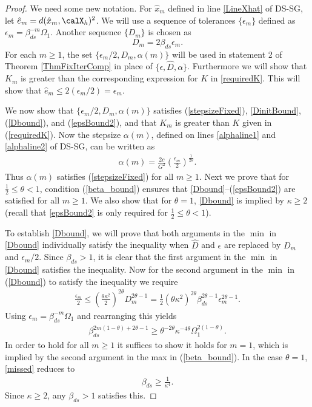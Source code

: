  \begin{proof}
 We need some new notation. For $\hat{x}_m$ defined in line \ref{LineXhat} of DS-SG, let $\hat{e}_m=d(\hat{x}_m,\calX_h)^2$. We will use a sequence of tolerances $\{\epsilon_m\}$ defined as $\epsilon_m=\beta_{ds}^{-m}\Omega_1$. Another sequence $\{D_m\}$ is chosen as 
 $$D_m = 2\beta_{ds}\epsilon_m.$$ 
   For each $m\geq 1$, the set $\{\epsilon_m/2,D_m,\alpha(m)\}$ will be used in statement 2 of Theorem \ref{ThmFixIterComp} in place of $\{\epsilon,\hat{D},\alpha\}$. Furthermore we will show that $K_m$ is greater than the corresponding expression for $K$ in \eqref{requiredK}. This will show that $\hat{e}_m\leq 2(\epsilon_m/2)=\epsilon_m$.
   


   We now show that $\{\epsilon_m/2,D_m,\alpha(m)\}$ satisfies (\ref{stepsizeFixed}), \eqref{DinitBound}, (\ref{Dbound}),  and (\ref{epsBound2}), and that $K_m$ is greater than $K$ given in (\ref{requiredK}). Now
the stepsize $\alpha(m)$, defined on lines \ref{alphaline1} and \ref{alphaline2} of DS-SG, can be written as
   \begin{eqnarray*}
   \alpha(m) = \frac{2 c}{ G^2}\left(\frac{\epsilon_m}{2}\right)^{\frac{1}{2\theta}}.
   \end{eqnarray*}
       Thus $\alpha(m)$ satisfies (\ref{stepsizeFixed}) for all $m\geq 1$. %
          Next we prove that for $\frac{1}{2}\leq \theta<1$, condition (\ref{beta_bound}) ensures that \eqref{Dbound}--(\ref{epsBound2}) are satisfied for all $m\geq 1$. We also show that for $\theta=1$, \eqref{Dbound} is implied by $\kappa\geq 2$ (recall that \eqref{epsBound2} is only required for $\frac{1}{2}\leq\theta<1$). 
          
             To establish \eqref{Dbound}, we will prove that both arguments in the $\min$ in \eqref{Dbound} individually satisfy the inequality when $\hat{D}$ and $\epsilon$ are replaced by $D_m$ and $\epsilon_{m}/2$.
          Since $\beta_{ds}>1$, it is clear that the first argument in the $\min$ in \eqref{Dbound} satisfies the inequality.
Now for the second argument in the $\min$ in (\ref{Dbound}) to satisfy the inequality we require
\begin{eqnarray*}
	\frac{\epsilon_m}{2}\leq 
	\left(\frac{\theta\kappa^2}{2}\right)^{2\theta}
	D_m^{2\theta-1} = 
	\frac{1}{2}\left(\theta\kappa^2\right)^{2\theta}
	\beta_{ds}^{2\theta-1}\epsilon_m^{2\theta-1}.
\end{eqnarray*}
Using $\epsilon_m=\beta_{ds}^{-m}\Omega_1$ and rearranging this yields
\begin{eqnarray}
	\beta_{ds}^{2m(1-\theta)+2\theta-1}\geq 
	\theta^{-2\theta}\kappa^{-4\theta}
	\Omega_1^{2(1-\theta)}.\label{missed}
\end{eqnarray}
In order to hold for all $m\geq 1$ it suffices to show it holds for $m=1$, which is implied by the second argument in the max in (\ref{beta_bound}).
In the case $\theta=1$,
\eqref{missed} reduces to 
\begin{align*}
\beta_{ds}\geq \frac{1}{\kappa^4}.
\end{align*}
Since $\kappa\geq 2$, any $\beta_{ds}>1$ satisfies this. 


\end{proof}

